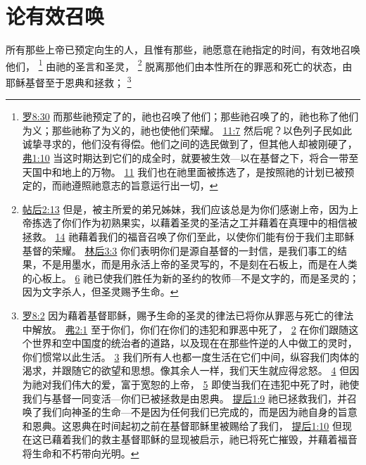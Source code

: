 \documentclass[12pt, a4paper, oneside]{ctexart}
\newcounter{parnum}[section]
\newcommand{\N}{%
   \noindent\refstepcounter{parnum}%
    \makebox[\parindent][l]{\textbf{\arabic{parnum}.}}}
\begin{document}
\section{论有效召唤}

\N 所有那些上帝已预定向生的人，且惟有那些，祂愿意在祂指定的时间，有效地召唤他们，
	\footnote {
		\href{https://biblehub.com/romans/8-30.htm}{罗8:30} 而那些祂预定了的，祂也召唤了他们；那些祂召唤了的，祂也称了他们为义；那些祂称了为义的，祂也使他们荣耀。
		\href{https://biblehub.com/romans/11-7.htm}{11:7} 然后呢？以色列子民如此诚挚寻求的，他们没有得偿。他们之间的选民做到了，但其他人却被刚硬了，
		\href{https://biblehub.com/ephesians/1-10.htm}{弗1:10} 当这时期达到它们的成全时，就要被生效---以在基督之下，将合一带至天国中和地上的万物。
		\href{https://biblehub.com/ephesians/1-11.htm}{11} 我们也在祂里面被拣选了，是按照祂的计划已被预定的，而祂遵照祂意志的旨意运行出一切，
	}
	由祂的圣言和圣灵，
	\footnote {
		\href{https://biblehub.com/2_thessalonians/2-13.htm}{帖后2:13} 但是，被主所爱的弟兄姊妹，我们应该总是为你们感谢上帝，因为上帝拣选了你们作为初熟果实，以藉着圣灵的圣洁之工并藉着在真理中的相信被拯救。
		\href{https://biblehub.com/2_thessalonians/2-14.htm}{14} 祂藉着我们的福音召唤了你们至此，以使你们能有份于我们主耶稣基督的荣耀。
		\href{https://biblehub.com/2_corinthians/3-3.htm}{林后3:3} 你们表明你们是源自基督的一封信，是我们事工的结果，不是用墨水，而是用永活上帝的圣灵写的，不是刻在石板上，而是在人类的心板上。
		\href{https://biblehub.com/2_corinthians/3-6.htm}{6} 祂已使我们胜任为新的圣约的牧师---不是文字的，而是圣灵的；因为文字杀人，但圣灵赐予生命。
	}
	脱离那他们由本性所在的罪恶和死亡的状态，由耶稣基督至于恩典和拯救；
	\footnote {
		\href{https://biblehub.com/romans/8-2.htm}{罗8:2} 因为藉着基督耶稣，赐予生命的圣灵的律法已将你从罪恶与死亡的律法中解放。 
		\href{https://biblehub.com/ephesians/2-1.htm}{弗2:1} 至于你们，你们在你们的违犯和罪恶中死了， 
		\href{https://biblehub.com/ephesians/2-2.htm}{2} 在你们跟随这个世界和空中国度的统治者的道路，以及现在在那些忤逆的人中做工的灵时，你们惯常以此生活。
		\href{https://biblehub.com/ephesians/2-3.htm}{3} 我们所有人也都一度生活在它们中间，纵容我们肉体的渴求，并跟随它的欲望和思想。像其余人一样，我们天生就应得忿怒。
		\href{https://biblehub.com/ephesians/2-4.htm}{4} 但因为祂对我们伟大的爱，富于宽恕的上帝，
		\href{https://biblehub.com/ephesians/2-5.htm}{5} 即使当我们在违犯中死了时，祂使我们与基督一同变活---你们已被拯救是由恩典。
		\href{https://biblehub.com/2_timothy/1-9.htm}{提后1:9} 祂已拯救我们，并召唤了我们向神圣的生命---不是因为任何我们已完成的，而是因为祂自身的旨意和恩典。这恩典在时间起初之前在基督耶稣里被赐给了我们，
		\href{https://biblehub.com/2_timothy/1-10.htm}{提后1:10} 但现在这已藉着我们的救主基督耶稣的显现被启示，祂已将死亡摧毁，并藉着福音将生命和不朽带向光明。
	}
\end{document}
